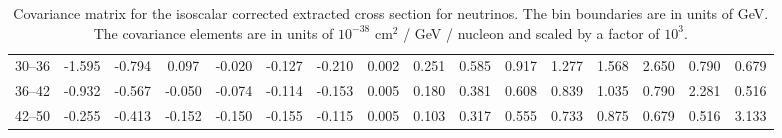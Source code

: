 \begin{table}[tb]
{\begin{tabular}{c|ccccccccccccccc}
    30--36 & -1.595 & -0.794 &  0.097 & -0.020 & -0.127 & -0.210 &  0.002 &  0.251 &  0.585 &  0.917 &  1.277 &  1.568 &  2.650 &  0.790 &  0.679 \\
    36--42 & -0.932 & -0.567 & -0.050 & -0.074 & -0.114 & -0.153 &  0.005 &  0.180 &  0.381 &  0.608 &  0.839 &  1.035 &  0.790 &  2.281 &  0.516 \\
    42--50 & -0.255 & -0.413 & -0.152 & -0.150 & -0.155 & -0.115 &  0.005 &  0.103 &  0.317 &  0.555 &  0.733 &  0.875 &  0.679 &  0.516 &  3.133 \\
    \hline
    \end{tabular} }
\caption{Covariance matrix for the isoscalar corrected extracted cross section for neutrinos. The bin boundaries are in units of GeV. The covariance elements are in units of $10^{-38}$ cm$^2$ / GeV / nucleon and scaled by a factor of $10^3$.}
\label{cov:FHC-nu-xsec-NOMAD}
\end{table}




